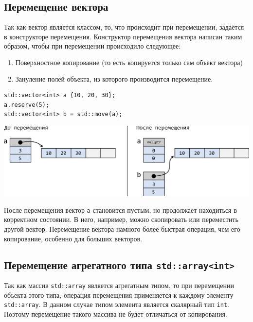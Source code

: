 \documentclass{article}
\begin{document}
\subsection*{Перемещение вектора}
Так как вектор является классом, то, что происходит при перемещении, задаётся в конструкторе перемещения. Конструктор перемещения вектора написан таким образом, чтобы при перемещении происходило следующее:
\begin{enumerate}
\item Поверхностное копирование (то есть копируется только сам объект вектора)
\item Зануление полей объекта, из которого производится перемещение.
\end{enumerate}
\begin{lstlisting}
std::vector<int> a {10, 20, 30};
a.reserve(5);
std::vector<int> b = std::move(a);
\end{lstlisting}
\begin{center}
\includegraphics[scale=1]{../images/move_vector.png}
\end{center}
После перемещения вектор \texttt{a} становится пустым, но продолжает находиться в корректном состоянии. В него, например, можно скопировать или переместить другой вектор. Перемещение вектора намного более быстрая операция, чем его копирование, особенно для больших векторов.



\subsection*{Перемещение агрегатного типа \texttt{std::array<int>}}
Так как массив \texttt{std::array} является агрегатным типом, то при перемещении объекта этого типа, операция перемещения применяется к каждому элементу \texttt{std::array}. В данном случае типом элемента является скалярный тип \texttt{int}. Поэтому перемещение такого массива не будет отличаться от копирования.\\
\end{document}
